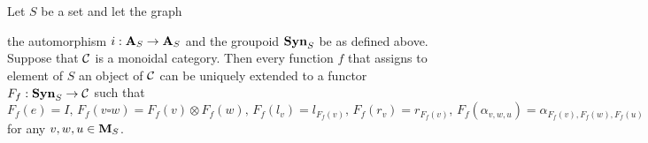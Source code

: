 \begin{proposition}\label{proposition:syntactictensorcategory}
Let $S$ be a set and let the graph
\begin{center}
\end{center}
the automorphism $i:\mathbf{A}_S\rightarrow \mathbf{A}_S$ and the groupoid  $\mathbf{Syn}_{S}$ be as defined above. Suppose that ${\mathcal C}$ is a monoidal category. Then every function $f$ that assigns to element of $S$ an object of ${\mathcal C}$ can be uniquely extended to a functor $F_f:\mathbf{Syn}_{S} \rightarrow {\mathcal C}$ such that 
$$F_f(e) = I,\,F_f(v\square w) = F_f(v)\otimes F_f(w),\,F_f(l_v) = l_{F_f(v)},\,F_f(r_v) = r_{F_f(v)},\,F_f(\alpha_{v,w,u}) = \alpha_{F_f(v),F_f(w),F_f(u)}$$
for any $v,w,u\in \mathbf{M}_S$.
\end{proposition} 
